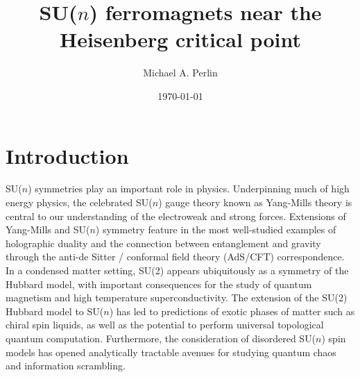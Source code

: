 \documentclass[nofootinbib,notitlepage,11pt]{revtex4-2}
\newcommand{\1}{\mathds{1}}
\begin{document}

\title{SU($n$) ferromagnets near the Heisenberg critical point}%
\author{Michael A. Perlin}%
\date{\today}

\maketitle

\tableofcontents

\section{Introduction}

SU($n$) symmetries play an important role in physics.  Underpinning
much of high energy physics, the celebrated SU($n$) gauge theory known
as Yang-Mills theory is central to our understanding of the
electroweak and strong forces.  Extensions of Yang-Mills and SU($n$)
symmetry feature in the most well-studied examples of holographic
duality\cite{maldacena1999largen} and the connection between
entanglement and gravity\cite{ryu2006holographic} through the anti-de
Sitter / conformal field theory (AdS/CFT) correspondence.  In a
condensed matter setting, SU(2) appears ubiquitously as a symmetry of
the Hubbard model, with important consequences for the study of
quantum magnetism and high temperature
superconductivity\cite{lee2006doping}.  The extension of the SU(2)
Hubbard model to SU($n$) has led to predictions of exotic phases of
matter such as chiral spin liquids\cite{hermele2009mott,
  hermele2011topological, chen2016syntheticgaugefield,
  nataf2016chiral}, as well as the potential to perform universal
topological quantum computation\cite{freedman2004class,
  nayak2008nonabelian}.  Furthermore, the consideration of disordered
SU($n$) spin models has opened analytically tractable avenues for
studying quantum chaos and information
scrambling\cite{sachdev1993gapless, bentsen2019integrable}.
\end{document}
